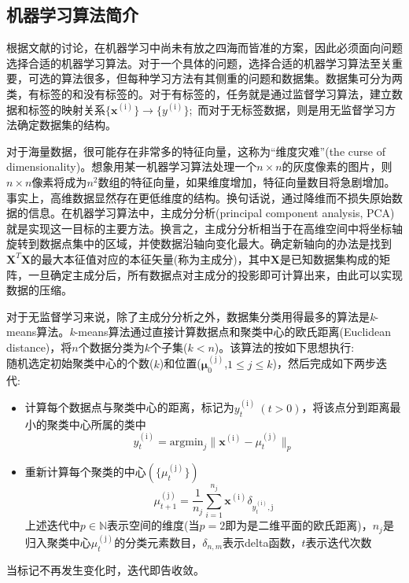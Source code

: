 \subsection{机器学习算法简介}
根据文献的讨论，在机器学习中尚未有放之四海而皆准的方案，因此必须面向问题选择合适的机器学习算法。对于一个具体的问题，选择合适的机器学习算法至关重要，可选的算法很多，但每种学习方法有其侧重的问题和数据集。数据集可分为两类，有标签的和没有标签的。对于有标签的，任务就是通过监督学习算法，建立数据和标签的映射关系$\{\mathbf{x}^{(\mathrm{i})}\}\rightarrow\{y^{(\mathrm{i})}\}$;~而对于无标签数据，则是用无监督学习方法确定数据集的结构。

对于海量数据，很可能存在非常多的特征向量，这称为“维度灾难”\textrm{(the curse of dimensionality)}。想象用某一机器学习算法处理一个$n\times n$的灰度像素的图片，则$n\times n$像素将成为$n^2$数组的特征向量，如果维度增加，特征向量数目将急剧增加。事实上，高维数据显然存在更低维度的结构。换句话说，通过降维而不损失原始数据的信息。在机器学习算法中，主成分分析(\textrm{principal component analysis, PCA})就是实现这一目标的主要方法\cite{OJS6-701_2016}。换言之，主成分分析相当于在高维空间中将坐标轴旋转到数据点集中的区域，并使数据沿轴向变化最大。确定新轴向的办法是找到$\mathbf{X}^T\mathbf{X}$的最大本征值对应的本征矢量(称为主成分)，其中$\mathbf{X}$是已知数据集构成的矩阵，一旦确定主成分后，所有数据点对主成分的投影即可计算出来，由此可以实现数据的压缩。

对于无监督学习来说，除了主成分分析之外，数据集分类用得最多的算法是\textit{k}-\textrm{means}算法\cite{EJHPS4-2_2008}。\textit{k}-\textrm{means}算法通过直接计算数据点和聚类中心的欧氏距离\textrm{(Euclidean distance)}，将$n$个数据分类为$k$个子集($k<n$)。该算法的按如下思想执行:\\
随机选定初始聚类中心的个数($k$)和位置($\mathbf{\mu}_0^{(\mathrm{j})}$,$1\leqslant j \leqslant k$)，然后完成如下两步迭代:~
\begin{itemize}
	\item 计算每个数据点与聚类中心的距离，标记为$y_t^{\mathrm{(i)}}~(t>0)$，将该点分到距离最小的聚类中心所属的类中
		\begin{displaymath}
			y_t^{(\mathrm{i})}=\textrm{argmin}_j\|\mathbf{x}^{(\mathrm{i})}-\mu_t^{(\mathrm{j})}\|_p
		\end{displaymath}
	\item 重新计算每个聚类的中心$(\{\mu_t^{(\mathrm{j})}\})$
		\begin{displaymath}
			\mu_{t+1}^{(\mathrm{j})}=\dfrac1{n_j}\sum_{i=1}^{n_j}\mathbf{x}^{(\mathrm{i})}\delta_{y_t^{(\mathrm{i})},\mathrm{j}}
		\end{displaymath}
		上述迭代中$p\in\mathbb{N}$表示空间的维度(当$p=2$即为是二维平面的欧氏距离)，$n_j$是归入聚类中心$\mu_t^{(\mathrm{j})}$的分类元素数目，$\delta_{n,m}$表示\textrm{delta}函数，$t$表示迭代次数
\end{itemize}
当标记不再发生变化时，迭代即告收敛。

